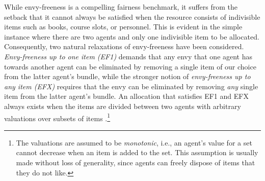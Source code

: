 \documentclass[11pt]{scrartcl}
\theoremstyle{definition}
\begin{document}
While envy-freeness is a compelling fairness benchmark, it suffers from the setback that it cannot always be satisfied when the resource consists of indivisible items such as books, course slots, or personnel.
This is evident in the simple instance where there are two agents and only one indivisible item to be allocated.
Consequently, two natural relaxations of envy-freeness have been considered.
\emph{Envy-freeness up to one item (EF1)} demands that any envy that one agent has towards another agent can be eliminated by removing a single item of our choice from the latter agent's bundle, while the stronger notion of \emph{envy-freeness up to any item (EFX)} requires that the envy can be eliminated by removing \emph{any} single item from the latter agent's bundle.
An allocation that satisfies EF1 and EFX always exists when the items are divided between two agents with arbitrary valuations over subsets of items \citep{LiptonMaMo04,PlautRo18}.\footnote{\label{footnote:monotonic}The valuations are assumed to be \emph{monotonic}, i.e., an agent's value for a set cannot decrease when an item is added to the set.
This assumption is usually made without loss of generality, since agents can freely dispose of items that they do not like.}
\end{document}
